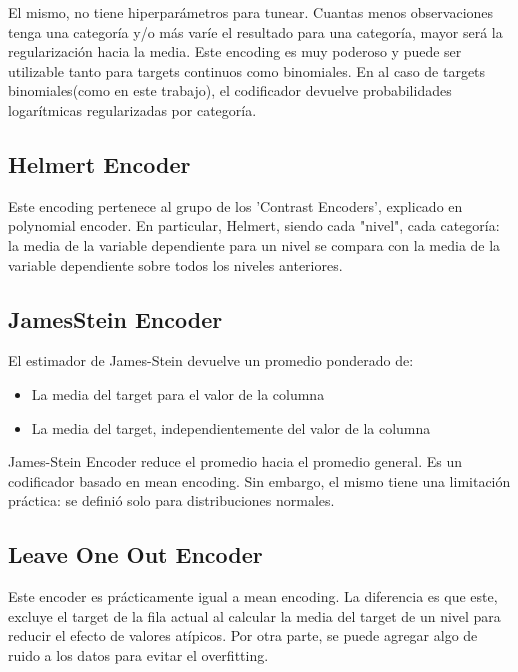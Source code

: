 \documentclass[12pt,a4paper]{article}
\begin{document}
El mismo, no tiene hiperparámetros para tunear. Cuantas menos observaciones tenga una categoría y/o más varíe el resultado para una categoría, mayor será la regularización hacia la media. Este encoding es muy poderoso y puede ser utilizable tanto para targets continuos como binomiales. En al caso de targets binomiales(como en este trabajo), el codificador devuelve probabilidades logarítmicas regularizadas por categoría.

\subsection{Helmert Encoder}

Este encoding pertenece al grupo de los 'Contrast Encoders', explicado en polynomial encoder.
En particular, Helmert, siendo cada "nivel", cada categoría: la media de la variable dependiente para un nivel se compara con la media de la variable dependiente sobre todos los niveles anteriores.

\subsection{JamesStein Encoder}
El estimador de James-Stein devuelve un promedio ponderado de:
\begin{itemize}
    \item La media del target para el valor de la columna 
    \item La media del target, independientemente del valor de la columna
\end{itemize}
James-Stein Encoder reduce el promedio hacia el promedio general. Es un codificador basado en mean encoding. Sin embargo, el mismo tiene una limitación práctica: se definió solo para distribuciones normales.
\subsection{Leave One Out Encoder}

Este encoder es prácticamente igual a mean encoding. La diferencia es que este, excluye el target de la fila actual al calcular la media del target de un nivel para reducir el efecto de valores atípicos. \newline
Por otra parte, se puede agregar algo de ruido a los datos para evitar el overfitting. 
\end{document}
